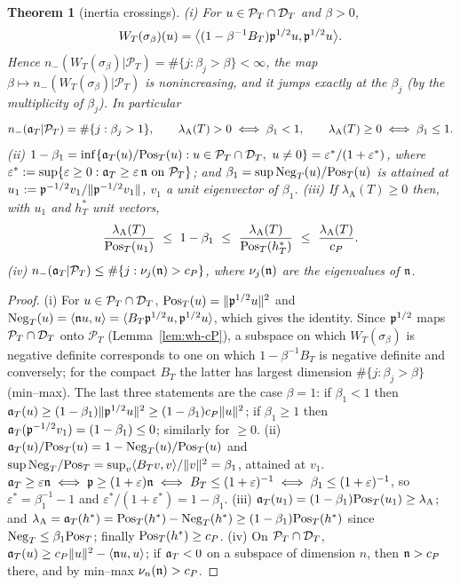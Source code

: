 \documentclass[11pt]{amsart}
\newtheorem{theorem}{Theorem}[section]
\theoremstyle{definition}
\theoremstyle{remark}
\newcommand{\PT}{\mathcal P_T}
\begin{document}
\begin{theorem}[inertia crossings]\label{thm:wh-pencil}
\emph{(i)} For $u\in\PT\cap\DT$ and $\beta>0$,
\[
W_T(\sigma_\beta)(u)=\big\langle(1-\beta^{-1}B_T)\mathfrak p^{1/2}u,\mathfrak p^{1/2}u\big\rangle .
\]
Hence $n_-(W_T(\sigma_\beta)|\PT)=\#\{j:\beta_j>\beta\}<\infty$, the map $\beta\mapsto n_-(W_T(\sigma_\beta)|\PT)$
is nonincreasing, and it jumps exactly at the $\beta_j$ (by the multiplicity of $\beta_j$). In particular
\[
n_-(\fa|\PT)=\#\{j:\beta_j>1\},\qquad \lambda_{\mathrm A}(T)>0\iff\beta_1<1,\qquad \lambda_{\mathrm A}(T)\ge0\iff\beta_1\le1 .
\]
\emph{(ii)} $1-\beta_1=\inf\{\fa(u)/\Pos(u):u\in\PT\cap\DT,\ u\ne0\}=\varepsilon^*/(1+\varepsilon^*)$, where
$\varepsilon^*:=\sup\{\varepsilon\ge0:\fa\ge\varepsilon\,\fn\text{ on }\PT\}$; and
$\beta_1=\sup\mathrm{Neg}_T(u)/\mathrm{Pos}_T(u)$ is attained at $u_1:=\mathfrak p^{-1/2}v_1/\|\mathfrak p^{-1/2}v_1\|$, $v_1$ a unit eigenvector of $\beta_1$.
\emph{(iii)} If $\lambda_{\mathrm A}(T)\ge0$ then, with $u_1$ and $h^*_T$ unit vectors,
\begin{equation}\label{eq:wh-sandwich}
\frac{\lambda_{\mathrm A}(T)}{\Pos(u_1)}\ \le\ 1-\beta_1\ \le\ \frac{\lambda_{\mathrm A}(T)}{\Pos(h^*_T)}\ \le\ \frac{\lambda_{\mathrm A}(T)}{c_P}.
\end{equation}
\emph{(iv)} $n_-(\fa|\PT)\le\#\{j:\nu_j(\fn)>c_P\}$, where $\nu_j(\mathfrak n)$ are the eigenvalues of $\mathfrak n$.
\end{theorem}
\begin{proof}
(i) For $u\in\PT\cap\DT$, $\mathrm{Pos}_T(u)=\|\mathfrak p^{1/2}u\|^2$ and $\mathrm{Neg}_T(u)=\langle\mathfrak n u,u\rangle=\langle B_T\mathfrak p^{1/2}u,\mathfrak p^{1/2}u\rangle$,
which gives the identity. Since $\mathfrak p^{1/2}$ maps $\PT\cap\DT$ onto $\PT$ (Lemma~\ref{lem:wh-cP}), a subspace on
which $W_T(\sigma_\beta)$ is negative definite corresponds to one on which $1-\beta^{-1}B_T$ is negative
definite and conversely; for the compact $B_T$ the latter has largest dimension $\#\{j:\beta_j>\beta\}$
(min--max). The last three statements are the case $\beta=1$: if $\beta_1<1$ then
$\mathfrak a_T(u)\ge(1-\beta_1)\|\mathfrak p^{1/2}u\|^2\ge(1-\beta_1)c_P\|u\|^2$; if $\beta_1\ge1$ then $\mathfrak a_T(\mathfrak p^{-1/2}v_1)=(1-\beta_1)\le0$;
similarly for $\ge0$. (ii) $\mathfrak a_T(u)/\mathrm{Pos}_T(u)=1-\mathrm{Neg}_T(u)/\mathrm{Pos}_T(u)$ and $\sup\mathrm{Neg}_T/\mathrm{Pos}_T=\sup_v\langle B_Tv,v\rangle/\|v\|^2=\beta_1$,
attained at $v_1$. $\mathfrak a_T\ge\varepsilon\mathfrak n\iff\mathfrak p\ge(1+\varepsilon)\mathfrak n\iff B_T\le(1+\varepsilon)^{-1}\iff\beta_1\le(1+\varepsilon)^{-1}$,
so $\varepsilon^*=\beta_1^{-1}-1$ and $\varepsilon^*/(1+\varepsilon^*)=1-\beta_1$. (iii) $\mathfrak a_T(u_1)=(1-\beta_1)\mathrm{Pos}_T(u_1)\ge\lambda_{\mathrm A}$;
and $\lambda_{\mathrm A}=\mathfrak a_T(h^*)=\mathrm{Pos}_T(h^*)-\mathrm{Neg}_T(h^*)\ge(1-\beta_1)\mathrm{Pos}_T(h^*)$ since $\mathrm{Neg}_T\le\beta_1\mathrm{Pos}_T$; finally $\mathrm{Pos}_T(h^*)\ge c_P$.
(iv) On $\PT\cap\DT$, $\mathfrak a_T(u)\ge c_P\|u\|^2-\langle\mathfrak n u,u\rangle$; if $\mathfrak a_T<0$ on a subspace of dimension $n$,
then $\mathfrak n>c_P$ there, and by min--max $\nu_n(\mathfrak n)>c_P$.
\end{proof}
\end{document}
